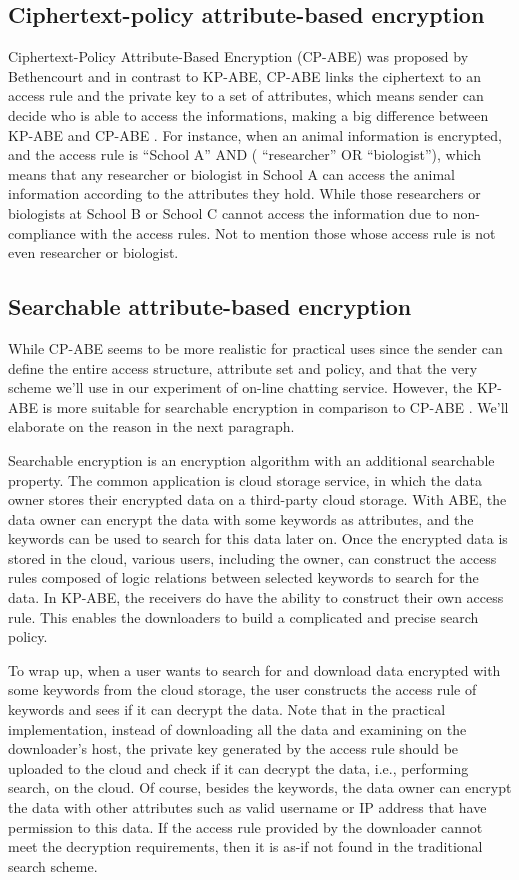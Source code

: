 \documentclass[12pt]{article}
\begin{document}
\subsection{Ciphertext-policy attribute-based encryption}
Ciphertext-Policy Attribute-Based Encryption (CP-ABE) was proposed by Bethencourt \cite{BSW:07} and in contrast to KP-ABE, CP-ABE links the ciphertext to an access rule and the private key to a set of attributes, which means sender can decide who is able to access the informations, making a big difference between KP-ABE and CP-ABE . For instance, when an animal information is encrypted, and the access rule is  “School A” AND ( “researcher” OR “biologist”), which means that any researcher or biologist in School A can access the animal information according to the attributes they hold. While those researchers or biologists at School B or School C cannot access the information due to non-compliance with the access rules. Not to mention those whose access rule is not even researcher or biologist.
\subsection{Searchable attribute-based encryption}
While CP-ABE seems to be more realistic for practical uses since the sender can define the entire access structure, attribute set and policy, and that the very scheme we’ll use in our experiment of on-line chatting service. However, the KP-ABE is more suitable for searchable encryption in comparison to CP-ABE \cite{HQZH:14}. We’ll elaborate on the reason in the next paragraph.

Searchable encryption is an encryption algorithm with an additional searchable property. The common application is cloud storage service, in which the data owner stores their encrypted data on a third-party cloud storage. With ABE, the data owner can encrypt the data with some keywords as attributes, and the keywords can be used to search for this data later on. Once the encrypted data is stored in the cloud, various users, including the owner, can construct the access rules composed of logic relations between selected keywords to search for the data. In KP-ABE, the receivers do have the ability to construct their own access rule. This enables the downloaders to build a complicated and precise search policy. 

To wrap up, when a user wants to search for and download data encrypted with some keywords from the cloud storage, the user constructs the access rule of keywords and sees if it can decrypt the data. Note that in the practical implementation, instead of downloading all the data and examining on the downloader’s host, the private key generated by the access rule should be uploaded to the cloud and check if it can decrypt the data, i.e., performing search, on the cloud. Of course, besides the keywords, the data owner can encrypt the data with other attributes such as valid username or IP address that have permission to this data. If the access rule provided by the downloader cannot meet the decryption requirements, then it is as-if not found in the traditional search scheme.
\end{document}
